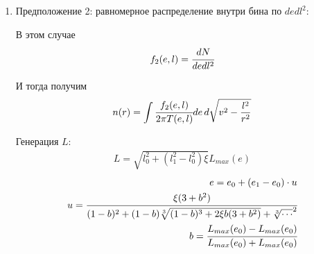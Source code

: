 \documentclass[a4paper, 14pt]{article}
\begin{document}
	 \begin{enumerate}

	 	
	 	
	 	\item Предположение 2: равномерное распределение внутри бина по $dedl^2$:
	 	
	 	В этом случае 
	 	\begin{equation}
	 		f_2(e,l) = \cfrac{dN}{de dl^2}
	 	\end{equation}
	 	
	 	И тогда получим
	 	\begin{equation}
	 		n(r) = \int{\cfrac{f_2(e,l) }{2\pi T(e,l)} de \, d\sqrt{v^2-\frac{l^2}{r^2}} }
	 	\end{equation}
	 	
	 	Генерация $L$:
	 	\begin{eqnarray}
	 		L = \sqrt{l^2_0 + (l^2_1-l^2_0)\xi}L_{max}(e) 		
	 	\end{eqnarray}
	 	\begin{eqnarray}
	 		e = e_0 + (e_1-e_0)\cdot u \\
	 		u = \cfrac{\xi(3 + b^2)}{(1-b)^2+(1-b)\sqrt[3]{(1-b)^3+2\xi b(3 + b^2)} + \sqrt[3]{\cdots}^2} \\
	 		b = \cfrac{L_{max}(e_0)-L_{max}(e_0)}{L_{max}(e_0)+L_{max}(e_0)}
	 	\end{eqnarray}
	 	

\end{enumerate}
\end{document}
